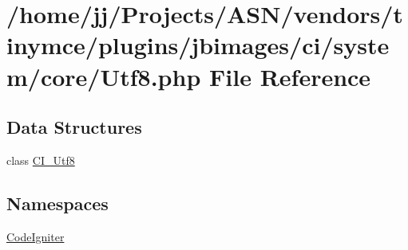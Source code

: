 \hypertarget{_utf8_8php}{}\section{/home/jj/\+Projects/\+A\+S\+N/vendors/tinymce/plugins/jbimages/ci/system/core/\+Utf8.php File Reference}
\label{_utf8_8php}
\subsection*{Data Structures}
\begin{DoxyCompactItemize}
\item 
class \hyperlink{class_c_i___utf8}{C\+I\+\_\+\+Utf8}
\end{DoxyCompactItemize}
\subsection*{Namespaces}
\begin{DoxyCompactItemize}
\item 
 \hyperlink{namespace_code_igniter}{Code\+Igniter}
\end{DoxyCompactItemize}
